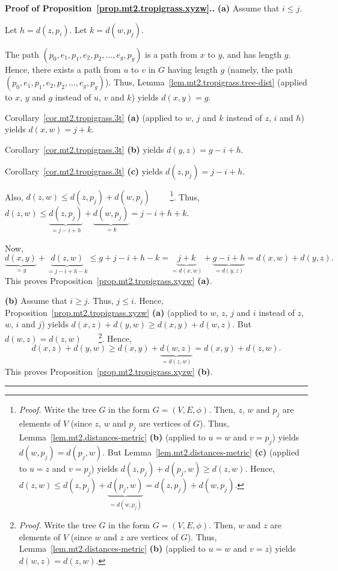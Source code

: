 \documentclass[numbers=enddot,12pt,final,onecolumn,notitlepage]{scrartcl}%
\theoremstyle{definition}
\newenvironment{proof}[1][Proof]{\noindent\textbf{#1.} }{\ \rule{0.5em}{0.5em}}
\newcommand{\tup}[1]{\left( #1 \right)}
\begin{document}
\begin{proof}[Proof of Proposition~\ref{prop.mt2.tropigrass.xyzw}.]
\textbf{(a)} Assume that $i \leq j$.

Let $h = d \tup{z, p_i}$.
Let $k = d \tup{w, p_j}$.

The path $\tup{p_0, e_1, p_1, e_2, p_2, \ldots, e_g, p_g}$ is a path
from $x$ to $y$, and has length $g$.
Hence, there exists a path from $u$ to $v$ in $G$ having
length $g$ (namely, the path
$\tup{p_0, e_1, p_1, e_2, p_2, \ldots, e_g, p_g}$).
Thus, Lemma~\ref{lem.mt2.tropigrass.tree-dist}
(applied to $x$, $y$ and $g$ instead of $u$, $v$ and $k$)
yields $d \tup{x, y} = g$.

Corollary~\ref{cor.mt2.tropigrass.3t} \textbf{(a)} (applied
to $w$, $j$ and $k$ instead of $z$, $i$ and $h$) yields
$d \tup{x, w} = j + k$.

Corollary~\ref{cor.mt2.tropigrass.3t} \textbf{(b)} yields
$d \tup{y, z} = g - i + h$.

Corollary~\ref{cor.mt2.tropigrass.3t} \textbf{(c)} yields
$d \tup{z, p_j} = j - i + h$.

Also, $d \tup{z, w} \leq d \tup{z, p_j} + d \tup{w, p_j}$
\ \ \ \ \footnote{\textit{Proof.}
  Write the tree $G$ in the form $G = \tup{V, E, \phi}$.
  Then, $z$, $w$ and $p_j$ are elements of $V$ (since
  $z$, $w$ and $p_j$ are vertices of $G$).
  Thus, Lemma~\ref{lem.mt2.distances-metric} \textbf{(b)}
  (applied to $u = w$ and $v = p_j$) yields
  $d \tup{w, p_j} = d \tup{p_j, w}$.
  But Lemma~\ref{lem.mt2.distances-metric} \textbf{(c)}
  (applied to $u = z$ and $v = p_j$) yields
  $d \tup{z, p_j} + d \tup{p_j, w} \geq d \tup{z, w}$.
  Hence,
  $d \tup{z, w}
  \leq
   d \tup{z, p_j} + \underbrace{d \tup{p_j, w}}_{= d \tup{w, p_j}}
  = d \tup{z, p_j} + d \tup{w, p_j}$.
  }.
Thus,
$d \tup{z, w}
\leq
 \underbrace{d \tup{z, p_j}}_{= j - i + h}
 + \underbrace{d \tup{w, p_j}}_{= k}
= j - i + h + k$.

Now,
\[
\underbrace{d \tup{x, y}}_{= g}
  + \underbrace{d \tup{z, w}}_{= j - i + h - k}
\leq g + j - i + h - k
= \underbrace{j + k}_{= d \tup{x, w}}
  + \underbrace{g - i + h}_{= d \tup{y, z}}
= d \tup{x, w} + d \tup{y, z}.
\]
This proves
Proposition~\ref{prop.mt2.tropigrass.xyzw} \textbf{(a)}.

\textbf{(b)} Assume that $i \geq j$.
Thus, $j \leq i$.
Hence, Proposition~\ref{prop.mt2.tropigrass.xyzw} \textbf{(a)}
(applied to $w$, $z$, $j$ and $i$ instead of $z$, $w$, $i$
and $j$) yields
$d \tup{x, z} + d \tup{y, w} \geq d \tup{x, y} + d \tup{w, z}$.
But $d \tup{w, z} = d \tup{z, w}$\ \ \ \ \footnote{\textit{Proof.}
  Write the tree $G$ in the form $G = \tup{V, E, \phi}$.
  Then, $w$ and $z$ are elements of $V$ (since
  $w$ and $z$ are vertices of $G$).
  Thus, Lemma~\ref{lem.mt2.distances-metric} \textbf{(b)}
  (applied to $u = w$ and $v = z$) yields
  $d \tup{w, z} = d \tup{z, w}$.
  }.
Hence,
\[
d \tup{x, z} + d \tup{y, w}
\geq d \tup{x, y} + \underbrace{d \tup{w, z}}_{= d \tup{z, w}}
= d \tup{x, y} + d \tup{z, w} .
\]
This proves
Proposition~\ref{prop.mt2.tropigrass.xyzw} \textbf{(b)}.
\end{proof}
\end{document}
